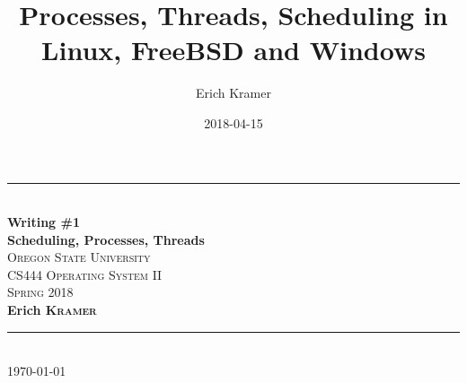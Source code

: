 \documentclass[letterpaper,10pt,notitlepage,fleqn]{article}
\title{Processes, Threads, Scheduling in Linux, FreeBSD and Windows}
\date{2018-04-15}
\author{Erich Kramer}
\begin{document}
\begin{titlepage}
\vspace*{\fill}

\newcommand{\HRule}{\rule{\linewidth}{0.5mm}} %

\center %


\HRule \\[0.4cm]
{ \huge \bfseries Writing \#1 \\Scheduling, Processes, Threads}\\[0.4cm] %


\textsc{\Large Oregon State University}\\[0.5cm] %
\textsc{\Large CS444 Operating System II}\\[0.5cm] %
\textsc{\large Spring 2018}\\[0.5cm] %
        \noindent \textbf{Erich \textsc{Kramer}} \\ %

\HRule \\[1.5cm]

{\large \today}\\[3cm] %




\vfill %



\end{titlepage}
\end{document}
